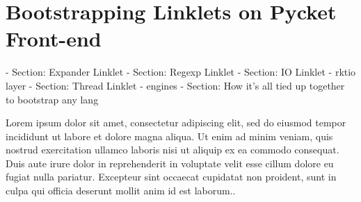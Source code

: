 \chapter{Bootstrapping Linklets on Pycket Front-end}

	- Section: Expander Linklet
	- Section: Regexp Linklet
	- Section: IO Linklet
		- rktio layer
	- Section: Thread Linklet
		- engines
	- Section: How it's all tied up together to bootstrap any lang 

Lorem ipsum dolor sit amet, consectetur adipiscing elit, sed do eiusmod tempor incididunt ut labore et dolore magna aliqua. Ut enim ad minim veniam, quis nostrud exercitation ullamco laboris nisi ut aliquip ex ea commodo consequat. Duis aute irure dolor in reprehenderit in voluptate velit esse cillum dolore eu fugiat nulla pariatur. Excepteur sint occaecat cupidatat non proident, sunt in culpa qui officia deserunt mollit anim id est laborum..
